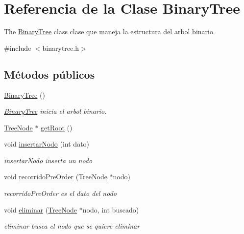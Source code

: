 \hypertarget{class_binary_tree}{}\section{Referencia de la Clase Binary\+Tree}
\label{class_binary_tree}


The \mbox{\hyperlink{class_binary_tree}{Binary\+Tree}} class clase que maneja la estructura del arbol binario.  




{\ttfamily \#include $<$binarytree.\+h$>$}

\subsection*{Métodos públicos}
\begin{DoxyCompactItemize}
\item 
\mbox{\hyperlink{class_binary_tree_adf45bce605436b26c353b87e27bffe50}{Binary\+Tree}} ()
\begin{DoxyCompactList}\small\item\em \mbox{\hyperlink{class_binary_tree}{Binary\+Tree}} inicia el arbol binario. \end{DoxyCompactList}\item 
\mbox{\hyperlink{class_tree_node}{Tree\+Node}} $\ast$ \mbox{\hyperlink{class_binary_tree_aabfed860b1c67b2a1cd12eacf870fc8c}{get\+Root}} ()
\item 
void \mbox{\hyperlink{class_binary_tree_a198bb1b6bd9d4fe1535d8189b9d3dc3e}{insertar\+Nodo}} (int dato)
\begin{DoxyCompactList}\small\item\em insertar\+Nodo inserta un nodo \end{DoxyCompactList}\item 
void \mbox{\hyperlink{class_binary_tree_ad7162208805ed8f96c59cc6ba47d25a1}{recorrido\+Pre\+Order}} (\mbox{\hyperlink{class_tree_node}{Tree\+Node}} $\ast$nodo)
\begin{DoxyCompactList}\small\item\em recorrido\+Pre\+Order es el dato del nodo \end{DoxyCompactList}\item 
void \mbox{\hyperlink{class_binary_tree_a457aa0a390da80c9d732c525dd006d0f}{eliminar}} (\mbox{\hyperlink{class_tree_node}{Tree\+Node}} $\ast$nodo, int buscado)
\begin{DoxyCompactList}\small\item\em eliminar busca el nodo que se quiere eliminar \end{DoxyCompactList}\item 

\end{DoxyCompactItemize}
